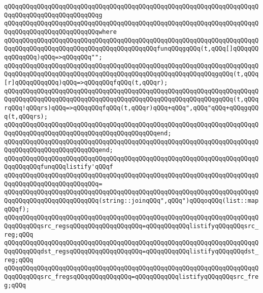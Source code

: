 \verb|qQQqqQQqqQQqqQQqqQQqqQQqqQQqqQQqqQQqqQQqqQQqqQQqqQQqqQQqqQQqqQQqqQQqqQQqqQQqqQQqqQQqqQQqqQQqqQQqg|\newline
\verb|qQQqqQQqqQQqqQQqqQQqqQQqqQQqqQQqqQQqqQQqqQQqqQQqqQQqqQQqqQQqqQQqqQQqqQQqqQQqqQQqqQQqqQQqqQQqqQQqwhere|\newline
\verb|qQQqqQQqqQQqqQQqqQQqqQQqqQQqqQQqqQQqqQQqqQQqqQQqqQQqqQQqqQQqqQQqqQQqqQQqqQQqqQQqqQQqqQQqqQQqqQQqqQQqqQQqqQQqqQQqfunqQQqgqQQq(t,qQQq[]qQQqqQQqqQQqqQQq)qQQq=>qQQqqQQq"";|\newline
\verb|qQQqqQQqqQQqqQQqqQQqqQQqqQQqqQQqqQQqqQQqqQQqqQQqqQQqqQQqqQQqqQQqqQQqqQQqqQQqqQQqqQQqqQQqqQQqqQQqqQQqqQQqqQQqqQQqqQQqqQQqqQQqqQQqgqQQq(t,qQQq[r]qQQqqQQqqQQq)qQQq=>qQQqqQQqfqQQq(t,qQQqr);|\newline
\verb|qQQqqQQqqQQqqQQqqQQqqQQqqQQqqQQqqQQqqQQqqQQqqQQqqQQqqQQqqQQqqQQqqQQqqQQqqQQqqQQqqQQqqQQqqQQqqQQqqQQqqQQqqQQqqQQqqQQqqQQqqQQqqQQqgqQQq(t,qQQqrqQQq!qQQqrs)qQQq=>qQQqqQQqfqQQq(t,qQQqr)qQQq+qQQq",qQQq"qQQq+qQQqgqQQq(t,qQQqrs);|\newline
\verb|qQQqqQQqqQQqqQQqqQQqqQQqqQQqqQQqqQQqqQQqqQQqqQQqqQQqqQQqqQQqqQQqqQQqqQQqqQQqqQQqqQQqqQQqqQQqqQQqqQQqqQQqqQQqqQQqend;|\newline
\verb|qQQqqQQqqQQqqQQqqQQqqQQqqQQqqQQqqQQqqQQqqQQqqQQqqQQqqQQqqQQqqQQqqQQqqQQqqQQqqQQqqQQqqQQqqQQqqQQqend;|\newline
\newline
\verb|qQQqqQQqqQQqqQQqqQQqqQQqqQQqqQQqqQQqqQQqqQQqqQQqqQQqqQQqqQQqqQQqqQQqqQQqqQQqqQQqfunqQQqlistify'qQQqf|\newline
\verb|qQQqqQQqqQQqqQQqqQQqqQQqqQQqqQQqqQQqqQQqqQQqqQQqqQQqqQQqqQQqqQQqqQQqqQQqqQQqqQQqqQQqqQQqqQQqqQQq=|\newline
\verb|qQQqqQQqqQQqqQQqqQQqqQQqqQQqqQQqqQQqqQQqqQQqqQQqqQQqqQQqqQQqqQQqqQQqqQQqqQQqqQQqqQQqqQQqqQQqqQQq(string::joinqQQq",qQQq")qQQqoqQQq(list::mapqQQqf);|\newline
\newline
\verb|qQQqqQQqqQQqqQQqqQQqqQQqqQQqqQQqqQQqqQQqqQQqqQQqqQQqqQQqqQQqqQQqqQQqqQQqqQQqqQQqsrc_regsqQQqqQQqqQQqqQQqqQQq=qQQqqQQqqQQqlistifyqQQqqQQqsrc_reg;qQQq|\newline
\verb|qQQqqQQqqQQqqQQqqQQqqQQqqQQqqQQqqQQqqQQqqQQqqQQqqQQqqQQqqQQqqQQqqQQqqQQqqQQqqQQqdst_regsqQQqqQQqqQQqqQQqqQQq=qQQqqQQqqQQqlistifyqQQqqQQqdst_reg;qQQq|\newline
\verb|qQQqqQQqqQQqqQQqqQQqqQQqqQQqqQQqqQQqqQQqqQQqqQQqqQQqqQQqqQQqqQQqqQQqqQQqqQQqqQQqsrc_fregsqQQqqQQqqQQqqQQq=qQQqqQQqqQQqlistifyqQQqqQQqsrc_freg;qQQq|\newline
